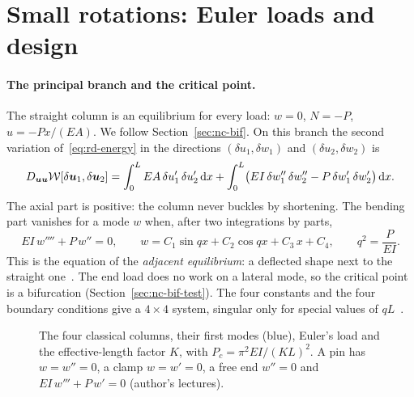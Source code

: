 \section{Small rotations: Euler loads and design}\label{sec:rd-euler}
%

\paragraph{The principal branch and the critical point.}
The straight column is an equilibrium for every load: $w = 0$, $N = -P$, $u = -Px/(EA)$. We
follow Section~\ref{sec:nc-bif}. On this branch the second variation of~\eqref{eq:rd-energy}
in the directions $(\delta u_1,\delta w_1)$ and $(\delta u_2,\delta w_2)$ is
\begin{equation}\label{eq:rd-second}
  D_{\bm{u}\bm{u}}\mathcal{W}[\delta\bm{u}_1,\delta\bm{u}_2] = \int_0^L EA\,\delta u_1'\,\delta u_2'\,\mathrm{d} x
  + \int_0^L \bigl(EI\,\delta w_1''\,\delta w_2'' - P\,\delta w_1'\,\delta w_2'\bigr)\,\mathrm{d} x .
\end{equation}
The axial part is positive: the column never buckles by shortening. The bending part
vanishes for a mode $w$ when, after two integrations by parts,
\begin{equation}\label{eq:rd-euler-eq}
  EI\,w'''' + P\,w'' = 0,
  \qquad
  w = C_1\sin qx + C_2\cos qx + C_3\,x + C_4,
  \qquad q^2 = \frac{P}{EI} .
\end{equation}
This is the equation of the \emph{adjacent equilibrium}: a deflected shape next to the
straight one~\cite[Section~1.3]{rd-brush1975}. The end load does no work on a lateral mode, so the critical point is a
bifurcation (Section~\ref{sec:nc-bif-test}). The four constants and the four boundary
conditions give a $4\times 4$ system, singular only for special values of $qL$~\cite[Section~2.2, Table~2.1]{rd-brush1975}.

\begin{figure}[ht]
  \centering
  
  \caption{The four classical columns, their first modes (blue), Euler's load and the
    effective-length factor $K$, with $P_c = \pi^2EI/(KL)^2$. A pin has $w = w'' = 0$, a clamp
    $w = w' = 0$, a free end $w'' = 0$ and $EI\,w''' + P\,w' = 0$ (author's lectures).}
  \label{fig:rd-supports}
\end{figure}

